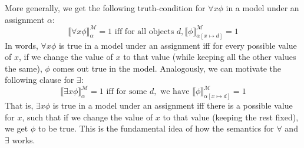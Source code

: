 \begin{enumerate}[\thesection.1]
		More generally, we get the following truth-condition for $\forall x\phi$ in a model under an assignment $\alpha$:
		\[\llbracket \forall x\phi\rrbracket^\mathcal{M}_\alpha=1\text{ iff for all objects }d,\llbracket \phi\rrbracket^\mathcal{M}_{\alpha[x\mapsto d]}=1\]
		In words, $\forall x\phi$ is true in a model under an assignment iff for every possible value of $x$, if we change the value of $x$ to that value (while keeping all the other values the same), $\phi$ comes out true in the model. Analogously, we can motivate the following clause for $\exists$:
			\[\llbracket \exists x\phi\rrbracket^\mathcal{M}_\alpha=1\text{ iff for some }d,\text{ we have }\llbracket \phi\rrbracket^\mathcal{M}_{\alpha[x\mapsto d]}=1\]
		That is, $\exists x\phi$ is true in a model under an assignment iff there is a possible value for $x$, such that if we change the value of $x$ to that value (keeping the rest fixed), we get $\phi$ to be true. This is the fundamental idea of how the semantics for $\forall$ and $\exists$ works.


\end{enumerate}
